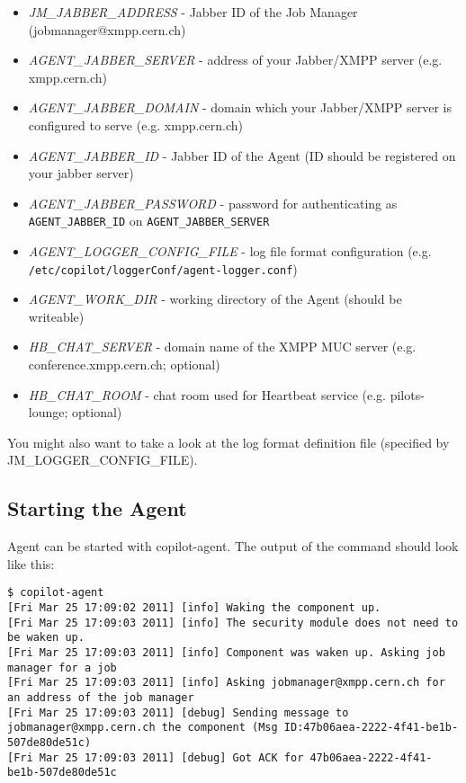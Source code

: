 \begin{itemize}
  \item \emph{JM\_JABBER\_ADDRESS} - Jabber ID of the Job Manager (jobmanager@xmpp.cern.ch)
  \item \emph{AGENT\_JABBER\_SERVER} - address of your Jabber/XMPP server (e.g. xmpp.cern.ch)
  \item \emph{AGENT\_JABBER\_DOMAIN} -  domain which your Jabber/XMPP server is configured to serve (e.g. xmpp.cern.ch)
  \item \emph{AGENT\_JABBER\_ID} - Jabber ID of the Agent (ID should be registered on your jabber server)
  \item \emph{AGENT\_JABBER\_PASSWORD} -  password for authenticating as \texttt{AGENT\_JABBER\_ID} on \texttt{AGENT\_JABBER\_SERVER}
  \item \emph{AGENT\_LOGGER\_CONFIG\_FILE} - log file format configuration (e.g. \texttt{/etc/copilot/loggerConf/agent-logger.conf})
  \item \emph{AGENT\_WORK\_DIR} - working directory of the Agent (should be writeable)
  \item \emph{HB\_CHAT\_SERVER} - domain name of the XMPP MUC server (e.g. conference.xmpp.cern.ch; optional)
  \item \emph{HB\_CHAT\_ROOM} - chat room used for Heartbeat service (e.g. pilots-lounge; optional)
\end{itemize}

You might also want to take a look at the log format definition file (specified by JM\_LOGGER\_CONFIG\_FILE).

\subsection{Starting the Agent}

Agent can be started with copilot-agent. The output of the command should look like this:

\lstset{caption=Starting \copilot Agent}
\begin{lstlisting}
$ copilot-agent
[Fri Mar 25 17:09:02 2011] [info] Waking the component up.
[Fri Mar 25 17:09:03 2011] [info] The security module does not need to be waken up.
[Fri Mar 25 17:09:03 2011] [info] Component was waken up. Asking job manager for a job
[Fri Mar 25 17:09:03 2011] [info] Asking jobmanager@xmpp.cern.ch for an address of the job manager
[Fri Mar 25 17:09:03 2011] [debug] Sending message to jobmanager@xmpp.cern.ch the component (Msg ID:47b06aea-2222-4f41-be1b-507de80de51c)
[Fri Mar 25 17:09:03 2011] [debug] Got ACK for 47b06aea-2222-4f41-be1b-507de80de51c
\end{lstlisting}


